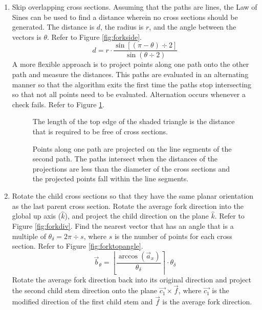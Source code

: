 \documentclass[10pt]{article}
\begin{document}
\begin{enumerate}
\item Skip overlapping cross sections. Assuming that the paths are lines, the Law of Sines can be used to find a distance wherein no cross sections should be generated. The distance is $ d $, the radius is $ r $, and the angle between the vectors is $ \theta $. Refer to Figure \ref{fig:forkside}.
\[ d = r \cdot \frac{\sin[(\pi-\theta)\div2]}{\sin (\theta\div2)} \]
A more flexible approach is to project points along one path onto the other path and measure the distances. This paths are evaluated in an alternating manner so that the algorithm exits the first time the paths stop intersecting so that not all points need to be evaluated. Alternation occurs whenever a check fails. Refer to Figure \ref{fig:path}.

\begin{figure}[H]
 \begin{minipage}[b]{0.46\textwidth}
  \centering
  
  \caption{The length of the top edge of the shaded triangle is the distance that is required to be free of cross sections.} \label{fig:forkside}
 \end{minipage}
 \hfill
 \begin{minipage}[b]{0.46\textwidth}
  \centering
  
  \caption{Points along one path are projected on the line segments of the second path. The paths intersect when the distances of the projections are less than the diameter of the cross sections and the projected points fall within the line segments.} \label{fig:path}
 \end{minipage}
\end{figure}

\item Rotate the child cross sections so that they have the same planar orientation as the last parent cross section. Rotate the average fork direction into the global up axis ($ \hat{k} $), and project the child direction on the plane $ \hat{k} $. Refer to Figure \ref{fig:forkdiv}. Find the nearest vector that has an angle that is a multiple of $ \theta_{\delta} = 2 \pi \div s $, where $ s $ is the number of points for each cross section. Refer to Figure \ref{fig:forktopangle}.
\[ \vec{b}_{\theta} = \left \lfloor \frac{\arccos(\vec{a}_x)}{\theta_{\delta}} \right\rceil \cdot \theta_{\delta} \]
Rotate the average fork direction back into its original direction and project the second child stem direction onto the plane $ \vec{c_1} \times \vec{f} $, where $ \vec{c_1} $ is the modified direction of the first child stem and $ \vec{f} $ is the average fork direction.


\end{enumerate}
\end{document}
